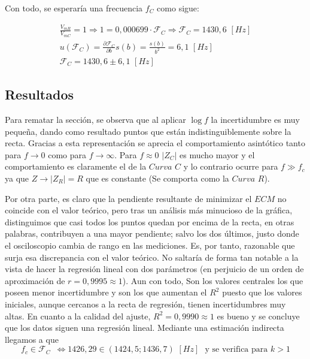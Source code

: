 \documentclass[11pt]{report}
\begin{document}
\begin{refsection}
Con todo, se esperaría una frecuencia $f_C$ como sigue:

\begin{equation}
\begin{split}
    \frac{V_{mR}}{V_{mC}}=1 \Rightarrow  1=0,000699 \cdot \mathscr{F}_C \Rightarrow \mathscr{F}_C = 1430,6\hspace{4pt}[Hz]\\
    u(\mathscr{F}_C)=\frac{\partial \mathscr{F}_C}{\partial b}s(b)= \frac{s(b)}{b^2}=6,1 \hspace{4pt}[Hz]\\
    \mathscr{F}_C= 1430,6 \pm 6,1 \hspace{4pt}[Hz]
\end{split}
\end{equation}

\subsection{Resultados}

Para rematar la sección, se observa que al aplicar $\log f$ la incertidumbre es muy pequeña,
dando como resultado puntos que están indistinguiblemente sobre la recta. Gracias a esta representación se aprecia
el comportamiento asintótico tanto para $f\to0$ como para $f\to\infty$. Para $f\approx0$ $|Z_C|$ es mucho mayor y el comportamiento
es claramente el de la $Curva \hspace{4pt}C$ y lo contrario ocurre para $f\gg f_c$ ya que $Z\to |Z_R|=R$ que es constante (Se comporta como la
$Curva\hspace{4pt} R$).

Por otra parte, es claro que la pendiente resultante de minimizar el $ECM$ no coincide con el valor teórico,
pero tras un análisis más minucioso de la gráfica, distinguimos que casi todos los puntos quedan por encima de la recta, en otras palabras,
contribuyen a una mayor pendiente; salvo los dos últimos, justo donde el osciloscopio cambia de rango en las mediciones. Es, por tanto,
razonable que surja esa discrepancia con el valor teórico. No saltaría de forma tan notable a la vista de hacer la regresión lineal con dos parámetros (en perjuicio de 
un orden de aproximación de $r=0,9995\approx 1$). Aun con todo, Son los valores centrales los que poseen menor incertidumbre y son los que 
aumentan el $R^2$ puesto que los valores iniciales, aunque cercanos a la recta de regresión, tienen incertidumbres muy altas.
En cuanto a la calidad del ajuste, $R^2=0,9990\approx 1$ es bueno y se concluye que
los datos siguen una regresión lineal. Mediante una estimación indirecta llegamos a que $$f_c\in\mathscr{F}_C\hspace{6pt} \iff 1426,29\in (1424,5;1436,7)\hspace{4pt}
[Hz] \hspace{8pt} \text{y se verifica para}\hspace{4pt} k>1$$


\end{refsection}
\end{document}
